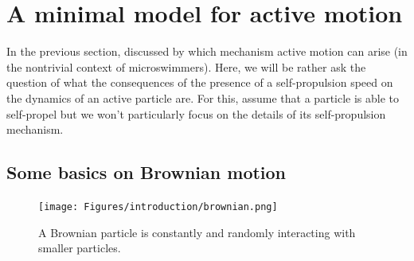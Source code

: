 
\section{A minimal model for active motion}


In the previous section, discussed by which mechanism active motion can arise (in the nontrivial context of microswimmers).
Here, we will be rather ask the question of what the consequences of the presence of a self-propulsion speed on the dynamics of an active particle are.
For this, assume that a particle is able to self-propel but we won't particularly focus on the details of its self-propulsion mechanism.


\subsection{Some basics on Brownian motion}

\begin{figure}[!htb]
    \centering
    \texttt{[image: Figures/introduction/brownian.png]}
    \caption{A Brownian particle is constantly and randomly interacting with smaller particles.}
    \label{fig: brownian}
\end{figure}

